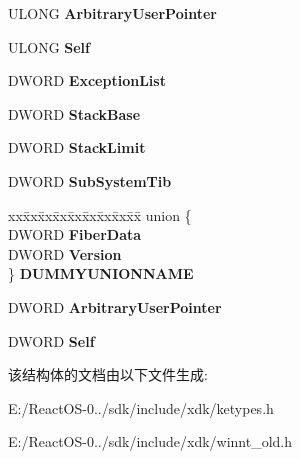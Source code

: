\begin{DoxyCompactItemize}
\begin{tabbing}
\end{tabbing}\item 
\mbox{\label{struct___n_t___t_i_b32_a0cc0111ac0a9be1dd6647806eb0a8694}} 
U\+L\+O\+NG {\bfseries Arbitrary\+User\+Pointer}
\item 
\mbox{\label{struct___n_t___t_i_b32_a06e2777cc689e7c85dc1e74a0a70e579}} 
U\+L\+O\+NG {\bfseries Self}
\item 
\mbox{\label{struct___n_t___t_i_b32_a3e8be83d0f8b5d21b07ac1e450892426}} 
D\+W\+O\+RD {\bfseries Exception\+List}
\item 
\mbox{\label{struct___n_t___t_i_b32_ac8623d280ce6dd8d776660a735faa2e7}} 
D\+W\+O\+RD {\bfseries Stack\+Base}
\item 
\mbox{\label{struct___n_t___t_i_b32_a7e5906e95187893d786626d5e3180b6b}} 
D\+W\+O\+RD {\bfseries Stack\+Limit}
\item 
\mbox{\label{struct___n_t___t_i_b32_a635083fb93d73cd40adad22819ab2bc3}} 
D\+W\+O\+RD {\bfseries Sub\+System\+Tib}
\item 
\mbox{\label{struct___n_t___t_i_b32_a9224013fde73fad74aec3798b0ab7a18}} 
\begin{tabbing}
xx\=xx\=xx\=xx\=xx\=xx\=xx\=xx\=xx\=\kill
union \{\\
\>DWORD {\bfseries FiberData}\\
\>DWORD {\bfseries Version}\\
\} {\bfseries DUMMYUNIONNAME}\\

\end{tabbing}\item 
\mbox{\label{struct___n_t___t_i_b32_a53372449a592433313c3fb30581a746f}} 
D\+W\+O\+RD {\bfseries Arbitrary\+User\+Pointer}
\item 
\mbox{\label{struct___n_t___t_i_b32_a3bf3ac1eb0eed1183a52ccbdd9ffc17a}} 
D\+W\+O\+RD {\bfseries Self}
\end{DoxyCompactItemize}


该结构体的文档由以下文件生成\+:\begin{DoxyCompactItemize}
\item 
E\+:/\+React\+O\+S-\/0../sdk/include/xdk/ketypes.\+h\item 
E\+:/\+React\+O\+S-\/0../sdk/include/xdk/winnt\+\_\+old.\+h\end{DoxyCompactItemize}
